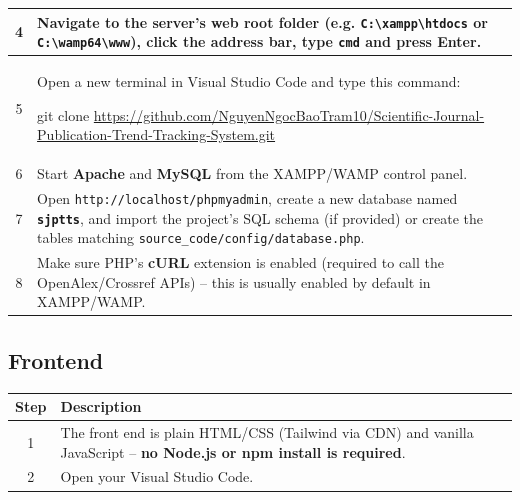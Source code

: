 \documentclass[12pt,a4paper]{article}
\begin{document}
{{{\begin{table}[H]
\begin{tabularx}{\textwidth}{|c|X|}
			\rowcolor{yellowrow}
			4 & Navigate to the server's web root folder (e.g. \texttt{C:\textbackslash xampp\textbackslash htdocs} or \texttt{C:\textbackslash wamp64\textbackslash www}), click the address bar, type \texttt{cmd} and press Enter. \\
			\hline
			
			5 & Open a new terminal in Visual Studio Code and type this command:
			
			git clone \url{https://github.com/NguyenNgocBaoTram10/Scientific-Journal-Publication-Trend-Tracking-System.git} \\
			\hline
			
			\rowcolor{yellowrow}
			6 & Start \textbf{Apache} and \textbf{MySQL} from the XAMPP/WAMP control panel. \\
			\hline
			
			7 & Open \texttt{http://localhost/phpmyadmin}, create a new database named \textbf{\texttt{sjptts}}, and import the project's SQL schema (if provided) or create the tables matching \texttt{source\_code/config/database.php}. \\
			\hline
			
			\rowcolor{yellowrow}
			8 & Make sure PHP's \textbf{cURL} extension is enabled (required to call the OpenAlex/Crossref APIs) -- this is usually enabled by default in XAMPP/WAMP. \\
			\hline
			
		\end{tabularx}
	\end{table}
}


\subsection{Frontend}

{
\begin{table}[H]
		\centering
		
		\begin{tabularx}{\textwidth}{|c|X|}
			\hline
			\rowcolor{blueheader}
			\textbf{Step} & \textbf{Description} \\
			\hline
			
			1 & The front end is plain HTML/CSS (Tailwind via CDN) and vanilla JavaScript -- \textbf{no Node.js or npm install is required}. \\
			\hline
			
			\rowcolor{bluerow}
			2 & Open your Visual Studio Code. \\
			\hline
			

\end{tabularx}
\end{table}}}}
\end{document}
